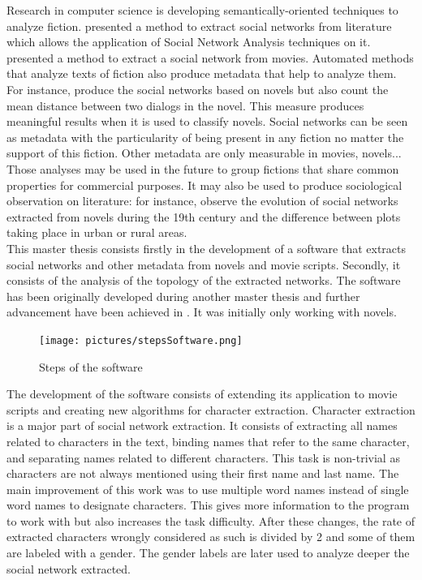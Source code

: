 \documentclass[a4paper, 12pt]{report}
\begin{document}
Research in computer science is developing semantically-oriented techniques to analyze fiction. \cite{character_country} presented a method to extract social networks from literature
 which allows the application of Social Network Analysis techniques on it. \cite{movie} presented a method to extract a social network from movies. Automated methods that analyze texts of fiction also produce metadata that help to analyze them.
For instance, \cite{original} produce the social networks based on novels but also count the mean distance between two dialogs in the novel.
This measure produces meaningful results when it is used to classify novels. Social networks can be seen as metadata with the particularity of being present in any fiction no matter the support of this fiction.
Other metadata are only measurable in movies, novels...
Those analyses may be used in the future to group fictions that share common properties for commercial purposes. It may also be used to produce sociological observation on literature: for instance, \cite{character_country} observe the evolution of social networks extracted from novels during the 19th century and the difference between plots taking place in urban or rural areas.\\

This master thesis consists firstly in the development of a software that extracts social networks and other metadata from novels and movie scripts. Secondly, it consists of the analysis of the topology of the extracted networks. The software has been originally developed during another master thesis \citep{original_thesis} and further advancement have been achieved in \cite{original}. It was initially only working with novels.\\


\begin{figure}[h!]
\centering
\texttt{[image: pictures/stepsSoftware.png]}
\caption[foo bar]{
Steps of the software
}
\label{software}
\end{figure}


The development of the software consists of extending its application to movie scripts and creating new algorithms for character extraction. Character extraction is a major part of social network extraction. It consists of extracting all names related to characters in the text, binding names that refer to the same character, and separating names related to different characters. This task is non-trivial as characters are not always mentioned using their first name and last name. The main improvement of this work was to use multiple word names instead of single word names to designate characters. This gives more information to the program to work with but also increases the task difficulty. After these changes, the rate of extracted characters wrongly considered as such is divided by 2 and some of them are labeled with a gender. The gender labels are later used to analyze deeper the social network extracted.\\
\end{document}
